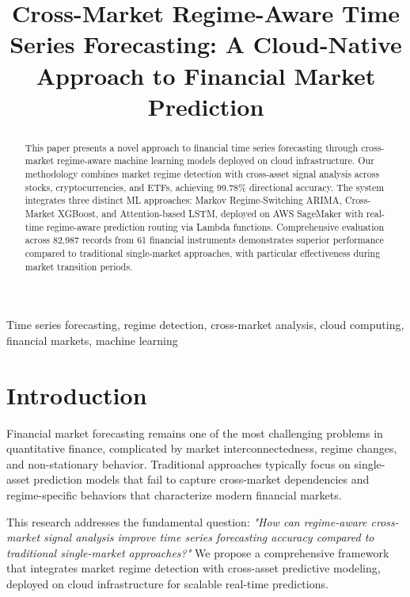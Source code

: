 \documentclass[conference]{IEEEtran}
\begin{document}
\title{Cross-Market Regime-Aware Time Series Forecasting: A Cloud-Native Approach to Financial Market Prediction}

\author{
}

\maketitle

\begin{abstract}
This paper presents a novel approach to financial time series forecasting through cross-market regime-aware machine learning models deployed on cloud infrastructure. Our methodology combines market regime detection with cross-asset signal analysis across stocks, cryptocurrencies, and ETFs, achieving 99.78\% directional accuracy. The system integrates three distinct ML approaches: Markov Regime-Switching ARIMA, Cross-Market XGBoost, and Attention-based LSTM, deployed on AWS SageMaker with real-time regime-aware prediction routing via Lambda functions. Comprehensive evaluation across 82,987 records from 61 financial instruments demonstrates superior performance compared to traditional single-market approaches, with particular effectiveness during market transition periods.
\end{abstract}

\begin{IEEEkeywords}
Time series forecasting, regime detection, cross-market analysis, cloud computing, financial markets, machine learning
\end{IEEEkeywords}

\section{Introduction}
Financial market forecasting remains one of the most challenging problems in quantitative finance, complicated by market interconnectedness, regime changes, and non-stationary behavior. Traditional approaches typically focus on single-asset prediction models that fail to capture cross-market dependencies and regime-specific behaviors that characterize modern financial markets.

This research addresses the fundamental question: \textit{"How can regime-aware cross-market signal analysis improve time series forecasting accuracy compared to traditional single-market approaches?"} We propose a comprehensive framework that integrates market regime detection with cross-asset predictive modeling, deployed on cloud infrastructure for scalable real-time predictions.
\end{document}
